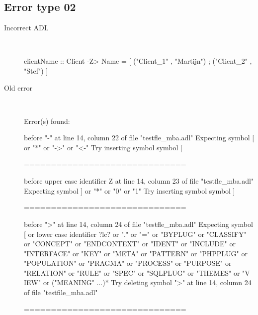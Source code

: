 \hrulefill

\subsection{Error type 02}
  \begin{description}
  \item[Incorrect ADL]~\\
\begin{adl}
clientName :: Client -Z> Name =
    [ ("Client_1"      , "Martijn")
    ; ("Client_2"      , "Stef")
    ]
\end{adl}
  \item[Old error]~\\
\begin{haskell}
Error(s) found:

before "-" at line 14, column 22 of file "testfle_mba.adl"
Expecting symbol [ or "*" or "->" or "<-"
Try inserting symbol symbol [

==============================

before upper case identifier Z at line 14, column 23 of file "testfle_mba.adl"
Expecting symbol ] or "*" or "0" or "1"
Try inserting symbol symbol ]

==============================

before ">" at line 14, column 24 of file "testfle_mba.adl"
Expecting symbol [ or lower case identifier ?lc? or "." or "=" or "BYPLUG" or "CLASSIFY" or "CONCEPT" or "ENDCONTEXT" or "IDENT" or "INCLUDE" or "INTERFACE" or
"KEY" or "META" or "PATTERN" or "PHPPLUG" or "POPULATION" or "PRAGMA" or "PROCESS" or "PURPOSE" or "RELATION" or "RULE" or "SPEC" or "SQLPLUG" or "THEMES" or "V
IEW" or ("MEANING" ...)*
Try deleting symbol ">" at line 14, column 24 of file "testfile_mba.adl"

==============================


\end{haskell}
\end{description}
